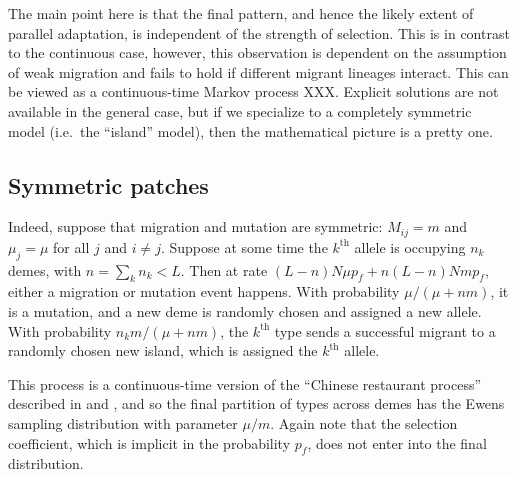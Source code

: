 \documentclass{article}
\begin{document}
{The main point here is that the final pattern,
and hence the likely extent of parallel adaptation,
is independent of the strength of selection.
This is in contrast to the continuous case, however, this observation is dependent on the assumption of weak migration
and fails to hold if different migrant lineages interact.
This can be viewed as a continuous-time Markov process XXX.
Explicit solutions are not available in the general case,
but if we specialize to a completely symmetric model (i.e.\ the ``island'' model),
then the mathematical picture is a pretty one.

\subsection{Symmetric patches}

Indeed, suppose that migration and mutation are symmetric: $M_{ij}=m$ and $\mu_j = \mu$ for all $j$ and $i\neq j$.
Suppose at some time the $k^\mathrm{th}$ allele is occupying $n_k$ demes, 
with $n = \sum_k n_k < L$.
Then at rate $(L-n) N \mu p_f + n (L-n) N m p_f$,
either a migration or mutation event happens.
With probability $\mu/(\mu + n m)$, it is a mutation,
and a new deme is randomly chosen and assigned a new allele.
With probability $n_k m / (\mu + n m)$,
the $k^\mathrm{th}$ type sends a successful migrant to a randomly chosen new island,
which is assigned the $k^\mathrm{th}$ allele.

This process is a continuous-time version of the ``Chinese restaurant process''
described in \citet{aldous1985exchangeability} and \citet{pitman1995partitions},
and so the final partition of types across demes has the Ewens sampling distribution with parameter $\mu/m$.
Again note that the selection coefficient, which is implicit in the probability $p_f$,
does not enter into the final distribution.

}
\end{document}

